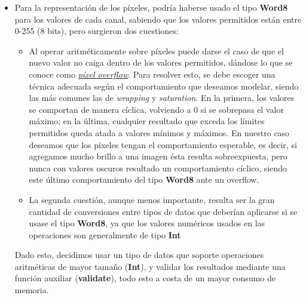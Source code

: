 \documentclass[a4paper, 11pt]{article} %
\begin{document}
\begin{itemize}
		
		\item Para la representación de los píxeles, podría haberse usado el tipo \textbf{Word8} para los valores de cada canal, sabiendo que los valores permitidos están entre 0-255 (8 bits), pero surgieron dos cuestiones:
		\begin{itemize} 
			\item Al operar aritméticamente sobre píxeles puede darse el caso de que el nuevo valor no caiga dentro de los valores permitidos, dándose lo que se conoce como \textit{\href{http://homepages.inf.ed.ac.uk/rbf/HIPR2/wrap.htm}{píxel overflow}}. Para resolver esto, se debe escoger una técnica adecuada según el comportamiento que deseamos modelar, siendo las más comunes las de \textit{wrapping} y \textit{saturation}. En la primera, los valores se comportan de manera cíclica, volviendo a 0 si se sobrepasa el valor máximo; en la última, cualquier resultado que exceda los límites permitidos queda atada a valores mínimos y máximos. En nuestro caso deseamos que los píxeles tengan el comportamiento esperable, es decir, si agregamos mucho brillo a una imagen ésta resulta sobreexpuesta, pero nunca con valores oscuros resultado un comportamiento cíclico, siendo este último comportamiento del tipo \textbf{Word8} ante un overflow.
			\item La segunda cuestión, aunque menos importante, resulta ser la gran cantidad de conversiones entre tipos de datos que deberían aplicarse si se usase el tipo \textbf{Word8}, ya que los valores numéricos usados en las operaciones son generalmente de tipo \textbf{Int}
		\end{itemize}
		Dado esto, decidimos usar un tipo de datos que soporte operaciones aritméticas de mayor tamaño (\textbf{Int}), y validar los resultados mediante una función auxiliar (\textbf{validate}), todo esto a costa de un mayor consumo de memoria.
		

\end{itemize}
\end{document}
